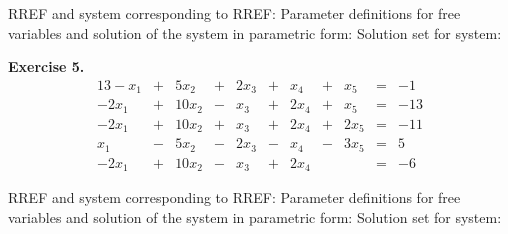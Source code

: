\documentclass[12pt]{article}
\begin{document}
RREF and system corresponding to RREF:
\vskip2in
Parameter definitions for free variables and solution of the system in parametric form:
\vskip2in
Solution set for system:
\clearpage

\textbf{Exercise 5.}
\begin{alignat*}{13}
- x_{1} &{}+{}& 5 x_{2} &{}+{}& 2 x_{3} &{}+{}& x_{4} &{}+{}& x_{5} &{}={}&-1\\ 
- 2 x_{1} &{}+{}& 10 x_{2} &{}-{}& x_{3} &{}+{}& 2 x_{4} &{}+{}& x_{5} &{}={}&-13\\ 
- 2 x_{1} &{}+{}& 10 x_{2} &{}+{}& x_{3} &{}+{}& 2 x_{4} &{}+{}& 2 x_{5} &{}={}&-11\\ 
x_{1} &{}-{}& 5 x_{2} &{}-{}& 2 x_{3} &{}-{}& x_{4} &{}-{}& 3 x_{5} &{}={}&5\\ 
- 2 x_{1} &{}+{}& 10 x_{2} &{}-{}& x_{3} &{}+{}& 2 x_{4}&{}{}& &{}={}&-6 
\end{alignat*}

RREF and system corresponding to RREF:
\vskip2in
Parameter definitions for free variables and solution of the system in parametric form:
\vskip2in
Solution set for system:
\clearpage
\end{document}
